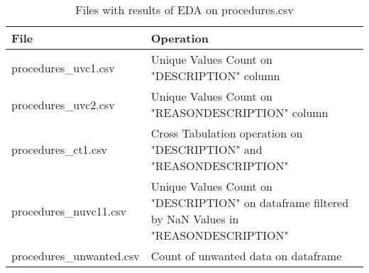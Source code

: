 \documentclass[12pt, twosided]{report}  %
\begin{document}
\begin{table}[H]
	\centering
	\begin{tabular}{p{4.5cm}|p{15cm}}
		\textbf{File}            & \textbf{Operation} \\ \hline
		procedures\_uvc1.csv     & Unique Values Count on "DESCRIPTION" column \\
		procedures\_uvc2.csv     & Unique Values Count on "REASONDESCRIPTION" column \\
		procedures\_ct1.csv      & Cross Tabulation operation on "DESCRIPTION" and "REASONDESCRIPTION" \\
		procedures\_nuvc11.csv      & Unique Values Count on "DESCRIPTION" on dataframe filtered by NaN Values in "REASONDESCRIPTION" \\
		procedures\_unwanted.csv & Count of unwanted data on dataframe
	\end{tabular}
	\caption{Files with results of EDA on procedures.csv}
\end{table}
\end{document}
